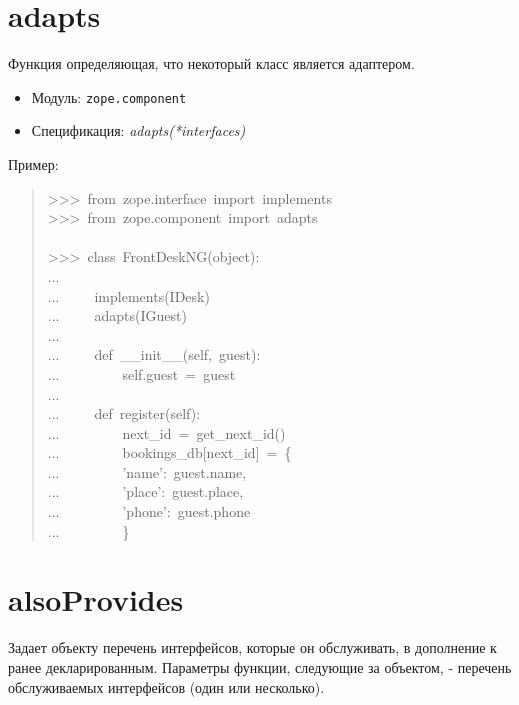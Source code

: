 \documentclass[a4paper,openany,twoside,final]{book}
\providecommand*{\DUroletitlereference}[1]{\textsl{#1}}
\begin{document}
\section*{adapts%
  \label{adapts}%
}

Функция определяющая, что некоторый класс является адаптером.

\begin{itemize}

\item Модуль: \texttt{zope.component}

\item Спецификация: \DUroletitlereference{adapts(*interfaces)}

\end{itemize}

Пример:

\begin{quote}{\ttfamily \raggedright \noindent
>{}>{}>~from~zope.interface~import~implements\\
>{}>{}>~from~zope.component~import~adapts\\
~\\
>{}>{}>~class~FrontDeskNG(object):\\
...\\
...~~~~~implements(IDesk)\\
...~~~~~adapts(IGuest)\\
...\\
...~~~~~def~\_\_init\_\_(self,~guest):\\
...~~~~~~~~~self.guest~=~guest\\
...\\
...~~~~~def~register(self):\\
...~~~~~~~~~next\_id~=~get\_next\_id()\\
...~~~~~~~~~bookings\_db{[}next\_id{]}~=~\{\\
...~~~~~~~~~'name':~guest.name,\\
...~~~~~~~~~'place':~guest.place,\\
...~~~~~~~~~'phone':~guest.phone\\
...~~~~~~~~~\}
}
\end{quote}


\section*{alsoProvides%
  \label{alsoprovides}%
}

Задает объекту перечень интерфейсов, которые он обслуживать, в дополнение
к ранее декларированным.  Параметры функции, следующие за объектом, -
перечень обслуживаемых интерфейсов (один или несколько).
\end{document}
